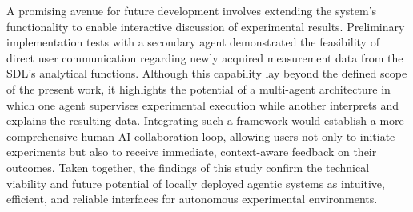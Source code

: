 A promising avenue for future development involves extending the system’s functionality to enable interactive discussion of experimental results. Preliminary implementation tests with a secondary agent demonstrated the feasibility of direct user communication regarding newly acquired measurement data from the SDL’s analytical functions. Although this capability lay beyond the defined scope of the present work, it highlights the potential of a multi-agent architecture in which one agent supervises experimental execution while another interprets and explains the resulting data. Integrating such a framework would establish a more comprehensive human-AI collaboration loop, allowing users not only to initiate experiments but also to receive immediate, context-aware feedback on their outcomes. Taken together, the findings of this study confirm the technical viability and future potential of locally deployed agentic systems as intuitive, efficient, and reliable interfaces for autonomous experimental environments.

